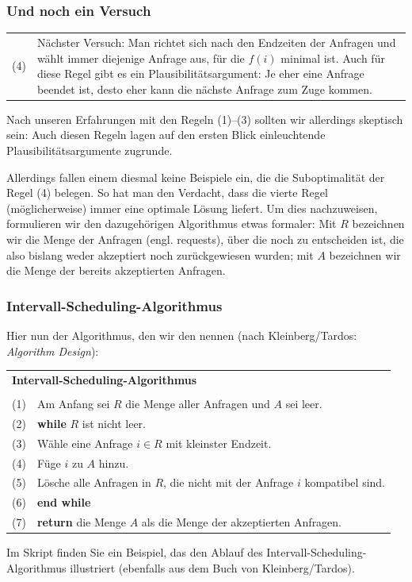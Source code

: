 \documentclass[smaller]{beamer}
\begin{document}
\begin{frame}
 \frametitle{Und noch ein Versuch}
 \begin{tabular}{p{0.5cm}p{10cm}} 
 (4) & Nächster Versuch: Man richtet sich nach den Endzeiten der Anfragen und wählt immer diejenige Anfrage aus, für die $f(i)$ minimal ist. Auch für diese Regel gibt es ein Plausibilitätsargument: Je eher eine Anfrage beendet ist, desto eher kann die nächste Anfrage zum Zuge kommen.
\end{tabular}
\medskip

\alert{Nach unseren Erfahrungen mit den Regeln (1)--(3) sollten wir allerdings skeptisch sein:} Auch diesen Regeln lagen auf den ersten Blick einleuchtende Plausibilitätsargumente zugrunde. \\ \vspace*{0.2cm}

\alert{Allerdings fallen einem diesmal keine Beispiele ein, die die Suboptimalität der Regel (4) belegen}. So hat man den Verdacht, dass die vierte Regel (möglicherweise) immer eine optimale Lösung liefert. Um dies nachzuweisen, formulieren wir den dazugehörigen Algorithmus etwas formaler: Mit $R$ bezeichnen wir die \alert{Menge der Anfragen (engl. requests)}, über die noch zu entscheiden ist, die also bislang weder akzeptiert noch zurückgewiesen wurden; mit $A$ bezeichnen wir die \alert{Menge der bereits akzeptierten Anfragen}.
\end{frame}

\begin{frame}
 \frametitle{Intervall-Scheduling-Algorithmus}
 Hier nun der Algorithmus, den wir den  nennen (nach Kleinberg/Tardos: \textit{Algorithm Design}):

\begin{center}
\begin{tabular}{rl}
\multicolumn{2}{l}{\textbf{Intervall-Scheduling-Algorithmus}} \\
& \\
 (1)& Am Anfang sei $R$ die Menge aller Anfragen und $A$ sei leer. \\
 (2)& \textbf{while} $R$ ist nicht leer. \\
 (3)& \qquad Wähle eine Anfrage $i \in R$ mit kleinster Endzeit. \\
 (4)& \qquad Füge $i$ zu $A$ hinzu. \\
 (5)& \qquad Lösche alle Anfragen in $R$, die nicht mit der Anfrage $i$ kompatibel sind. \\
 (6)& \textbf{end while} \\
 (7)& \textbf{return} die Menge $A$ als die Menge der akzeptierten Anfragen.
\end{tabular}
\end{center}

Im Skript finden Sie ein Beispiel, das den Ablauf des Intervall-Scheduling-Algorithmus illustriert (ebenfalls aus dem Buch von Kleinberg/Tardos).
\end{frame}
\end{document}

